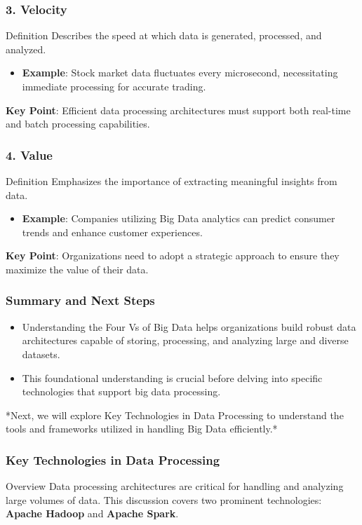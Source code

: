 \documentclass[aspectratio=169]{beamer}
\begin{document}
\begin{frame}[fragile]
    \frametitle{3. Velocity}
    \begin{block}{Definition}
        Describes the speed at which data is generated, processed, and analyzed. 
    \end{block}
    \begin{itemize}
        \item \textbf{Example}: Stock market data fluctuates every microsecond, necessitating immediate processing for accurate trading.
    \end{itemize}
    \textbf{Key Point}: Efficient data processing architectures must support both real-time and batch processing capabilities.
\end{frame}

\begin{frame}[fragile]
    \frametitle{4. Value}
    \begin{block}{Definition}
        Emphasizes the importance of extracting meaningful insights from data. 
    \end{block}
    \begin{itemize}
        \item \textbf{Example}: Companies utilizing Big Data analytics can predict consumer trends and enhance customer experiences.
    \end{itemize}
    \textbf{Key Point}: Organizations need to adopt a strategic approach to ensure they maximize the value of their data.
\end{frame}

\begin{frame}[fragile]
    \frametitle{Summary and Next Steps}
    \begin{itemize}
        \item Understanding the Four Vs of Big Data helps organizations build robust data architectures capable of storing, processing, and analyzing large and diverse datasets.
        \item This foundational understanding is crucial before delving into specific technologies that support big data processing.
    \end{itemize}
    *Next, we will explore Key Technologies in Data Processing to understand the tools and frameworks utilized in handling Big Data efficiently.*
\end{frame}

\begin{frame}[fragile]
    \frametitle{Key Technologies in Data Processing}
    \begin{block}{Overview}
        Data processing architectures are critical for handling and analyzing large volumes of data. This discussion covers two prominent technologies: 
        \textbf{Apache Hadoop} and \textbf{Apache Spark}.
    \end{block}
\end{frame}
\end{document}
